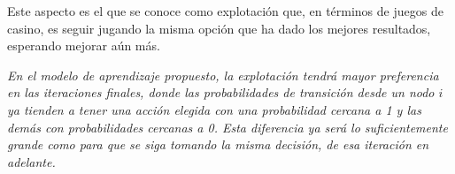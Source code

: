 Este aspecto es el que se conoce como explotación que, en términos de juegos de casino, es seguir jugando la misma opción que ha dado los mejores resultados, esperando mejorar aún más.

\textit{En el modelo de aprendizaje propuesto, la explotación tendrá mayor preferencia en las iteraciones finales, donde las probabilidades de transición desde un nodo $i$ ya tienden a tener una acción elegida con una probabilidad cercana a 1 y las demás con probabilidades cercanas a 0. Esta diferencia ya será lo suficientemente grande como para que se siga tomando la misma decisión, de esa iteración en adelante.}







